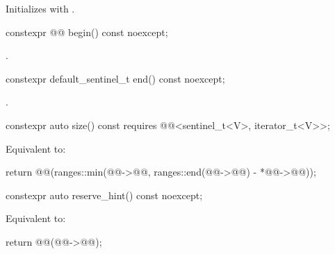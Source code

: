 \begin{itemdescr}
\pnum
\effects
Initializes  with .
\end{itemdescr}

%
\begin{itemdecl}
constexpr @@ begin() const noexcept;
\end{itemdecl}

\begin{itemdescr}
\pnum
\returns
{}.
\end{itemdescr}

%
\begin{itemdecl}
constexpr default_sentinel_t end() const noexcept;
\end{itemdecl}

\begin{itemdescr}
\pnum
\returns
{}.
\end{itemdescr}

%
\begin{itemdecl}
constexpr auto size() const
  requires @@<sentinel_t<V>, iterator_t<V>>;
\end{itemdecl}

\begin{itemdescr}
\pnum
\effects
Equivalent to:
\begin{codeblock}
return @@(ranges::min(@@->@@,
                                ranges::end(@@->@@) - *@@->@@));
\end{codeblock}
\end{itemdescr}

%
\begin{itemdecl}
constexpr auto reserve_hint() const noexcept;
\end{itemdecl}

\begin{itemdescr}
\pnum
\effects
Equivalent to:
\begin{codeblock}
return @@(@@->@@);
\end{codeblock}
\end{itemdescr}

